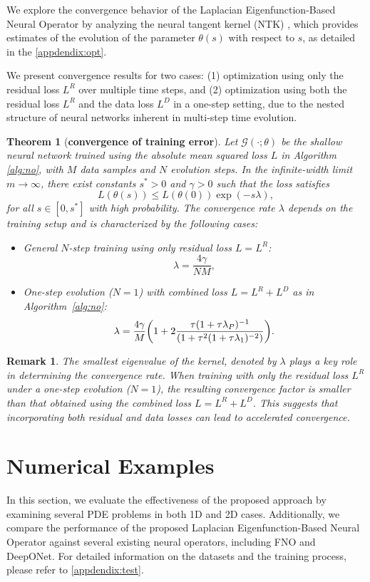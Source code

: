 \documentclass[preprint,12pt]{elsarticle}
\theoremstyle{plain}
\newtheorem{theorem}{Theorem}[section]
\newtheorem{remark}{Remark}[section]
\numberwithin{figure}{section}
\numberwithin{table}{section}
\begin{document}
We explore the convergence behavior of the Laplacian Eigenfunction-Based Neural Operator by analyzing the neural tangent kernel (NTK) \cite{jacot2018neural}, which provides estimates of the evolution of the parameter $\theta(s)$ with respect to $s$, as detailed in the  \ref{appdendix:opt}.

{We present convergence results for two cases: (1) optimization using only the residual loss $L^R$ over multiple time steps, and (2) optimization using both the residual loss $L^R$ and the data loss $L^D$ in a one-step setting, due to the nested structure of neural networks inherent in multi-step time evolution.}

\begin{theorem}[\bf convergence of training error]
\label{thm:opt}
Let $\mathcal{G}(\cdot;\theta)$ be the shallow neural network trained using the absolute mean squared loss $L$ in Algorithm \ref{alg:no}, with $M$ data samples and $N$ evolution steps. In the infinite-width limit $m \rightarrow \infty$, there exist constants $s^*>0$ and $\gamma > 0$ such that the loss satisfies 
$$L(\theta(s)) \le L(\theta(0))\exp(-s\lambda),$$
for all $s \in [0, s^*]$ with high probability. The convergence rate $\lambda$ depends on the training setup and is characterized by the following cases:
\begin{itemize}
\item[{(a)}] {General $N$-step training using only residual loss $L=L^R$:}
$$\lambda = \frac{4\gamma}{NM}, $$
\item[{(b)}] {One-step evolution ($N=1$) with combined loss $L = L^R + L^D$ as in Algorithm~\ref{alg:no}:}  
$${\lambda}={4\gamma\over M}\bigg(1+2 \frac{\tau(1+\tau\lambda_P)^{-1}}{(1+\tau^2(1+\tau\lambda_1)^{-2})}\bigg).$$
\end{itemize}
\end{theorem}


\begin{remark}
	The smallest eigenvalue of the kernel, denoted by $\lambda$ plays a key role in determining the convergence rate. When training with only the residual loss $L^R$ under a one-step evolution ($N = 1$), the resulting convergence factor is smaller than that obtained using the combined loss $L = L^R + L^D$. This suggests that incorporating both residual and data losses can lead to accelerated convergence.
\end{remark}


\section{Numerical Examples}\label{sec:experiment}
In this section, we evaluate the effectiveness of the proposed approach by examining several PDE problems in both 1D and 2D cases. Additionally, we compare the performance of the proposed Laplacian Eigenfunction-Based Neural Operator against several existing neural operators, including FNO and DeepONet. For detailed information on the datasets and the training process, please refer to  \ref{appdendix:test}.
\end{document}
